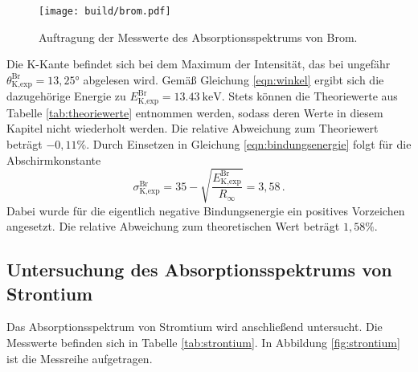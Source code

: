 \begin{figure}
  \centering
  \texttt{[image: build/brom.pdf]}
  \caption{Auftragung der Messwerte des Absorptionsspektrums von Brom.}
  \label{fig:brom}
\end{figure}

Die K-Kante befindet sich bei dem Maximum der Intensität, das bei ungefähr
$\theta_{\text{K,exp}}^{\text{Br}} = 13{,}25°$ abgelesen wird. Gemäß Gleichung \eqref{eqn:winkel} ergibt sich die dazugehörige Energie
zu $E_{\text{K,exp}}^{\text{Br}} = \SI{13.43}{\kilo\electronvolt}$.
Stets können die Theoriewerte aus Tabelle \ref{tab:theoriewerte} entnommen werden,
sodass deren Werte in diesem Kapitel nicht wiederholt werden. Die relative Abweichung zum Theoriewert
beträgt $-0{,}11\%$. Durch Einsetzen in Gleichung \eqref{eqn:bindungsenergie}
folgt für die Abschirmkonstante
\begin{equation*}
  \sigma_{\text{K,exp}}^{\text{Br}} =  35 - \sqrt{\frac{E_{\text{K,exp}}^{\text{Br}}}{R_\infty}} = 3{,}58\,.
\end{equation*}
Dabei wurde für die eigentlich negative Bindungsenergie ein positives Vorzeichen angesetzt.
Die relative Abweichung zum theoretischen Wert beträgt $1{,}58\%$.

\subsection{Untersuchung des Absorptionsspektrums von Strontium}
\label{subsec:strontium}

Das Absorptionsspektrum von Stromtium wird anschließend untersucht.
Die Messwerte befinden sich in Tabelle \ref{tab:strontium}.
In Abbildung \ref{fig:strontium} ist die Messreihe aufgetragen.

